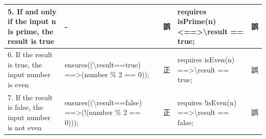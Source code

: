 \documentclass[uplatex, twocolumn, 10pt]{jsarticle} %
\begin{document}
\begin{table}[t]
\begin{tabular}{p{30mm}|p{45mm}|p{7mm}|p{45mm}|p{7mm}}
        5. If and only if the input n is prime, the result is true                                         & -                                                                                                                                                                                                                                                                                                                                                                                                                                                                                                        & 誤                                                               & requires isPrime(n) \textless==\textgreater \textbackslash result == true;                                                             & 誤    \\ \hline
        6. If the result is true, the input number is even                                                 & ensures((\textbackslash result==true) ==\textgreater (number \% 2 == 0));                                                                                                                                                                                                                                                                                                                                                                                                                                & 正                                                               & requires isEven(n) ==\textgreater \textbackslash result == true;                                                                       & 誤    \\ \hline
        7. If the result is false, the input number is not even                                            & ensures((\textbackslash result==false) ==\textgreater (!(number \% 2 == 0)));                                                                                                                                                                                                                                                                                                                                                                                                                            & 正                                                               & requires !isEven(n) ==\textgreater \textbackslash result == false;                                                                     & 誤    \\ \hline

\end{tabular}
\end{table}
\end{document}
